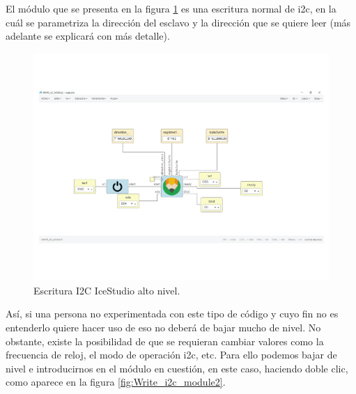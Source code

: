 El módulo que se presenta en la figura \ref{fig:Write_i2c_module} es una escritura normal de i2c, en la cuál se parametriza la dirección del esclavo y la dirección que se quiere leer (más adelante se explicará con más detalle). \newline

\begin{figure}[H]
	\center
	\includegraphics[trim = 0mm 25mm 0mm 0mm, clip,scale=0.6]{imagenes/EstadoArte/Write_i2c_module.pdf}
	\caption{Escritura I2C IceStudio alto nivel.}
	\label{fig:Write_i2c_module}
\end{figure}

Así, si una persona no experimentada con este tipo de código y cuyo fin no es entenderlo quiere hacer uso de eso no deberá de bajar mucho de nivel.\newline
No obstante, existe la posibilidad de que se requieran cambiar valores como la frecuencia de reloj, el modo de operación i2c, etc.
Para ello podemos bajar de nivel e introducirnos en el módulo en cuestión, en este caso, haciendo doble clic, como aparece en la figura \ref{fig:Write_i2c_module2}. 

